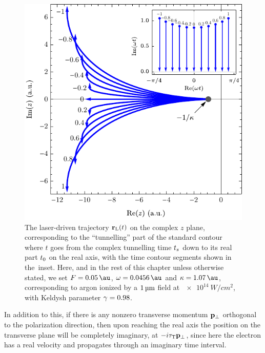 
\begin{figure}[htb]
  \centering
  \includegraphics[scale=1]{5-Quantum-orbits/Figures/figure5C.pdf}
  \caption[
  Laser-driven trajectory $\zl(t)$ in the complex $z$ plane, over the ``tunnelling'' downwards leg of the standard time contour
  ]{
  The laser-driven trajectory $\vb{r}_\mathrm{L}(t)$ on the complex $z$ plane, corresponding to the ``tunnelling'' part of the standard contour where $t$ goes from the complex tunnelling time ${t_s}$ down to its real part ${t_0}$ on the real axis, with the time contour segments shown in the~inset.
  Here, and in the rest of this chapter unless otherwise stated, we set $F=\SI{\onemicronparsfield}{\au}$, $\omega=\SI{\onemicronparsomega}{\au}$ and $\kappa=\SI{\onemicronparskappa}{\au}$, corresponding to argon ionized by a $\SI{1}{\micro m}$ field at $\SI{e14}{W/cm^2}$, with Keldysh parameter $\gamma=0.98$.
  }
\label{f5-imaginary-parts-of-position}
\end{figure}


In addition to this, if there is any nonzero transverse momentum ${\vb{p}_{\perp}}$ orthogonal to the polarization direction, then upon reaching the real axis the position on the transverse plane will be completely imaginary, at $-i{\tau_\mathrm{T}}{\vb{p}_{\perp}}$, since here the electron has a real velocity and propagates through an imaginary time interval. 

